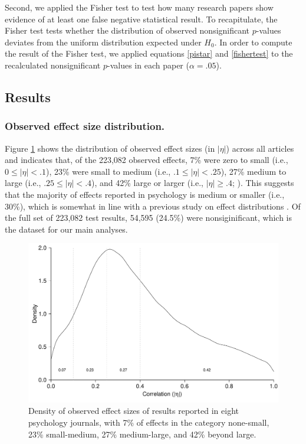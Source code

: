\documentclass{article}
\begin{document}
Second, we applied the Fisher test to test how many research papers show evidence of at least one false negative statistical result. To recapitulate, the Fisher test tests whether the distribution of observed nonsignificant $p$-values deviates from the uniform distribution expected under $H_0$. In order to compute the result of the Fisher test, we applied equations \ref{pistar} and \ref{fishertest} to the recalculated nonsignificant $p$-values in each paper ($\alpha=.05$).

\subsection*{Results}

\subsubsection*{Observed effect size distribution.}


Figure \ref{fig:fig1} shows the distribution of observed effect sizes (in $|\eta|$) across all articles and indicates that, of the 223,082 observed effects, 7\% were zero to small (i.e., $0\leq|\eta|<.1$), 23\% were small to medium (i.e., $.1\leq|\eta|<.25$), 27\% medium to large (i.e., $.25\leq|\eta|<.4$), and 42\% large or larger (i.e., $|\eta|\geq.4$; \cite{Cohen1988-wg}). This suggests that the majority of effects reported in psychology is medium or smaller (i.e., 30\%), which is somewhat in line with a previous study on effect distributions \cite{Gignac2016-je}. Of the full set of 223,082 test results, 54,595 (24.5\%) were nonsiginificant, which is the dataset for our main analyses. 

\begin{figure}
\begin{center}
\includegraphics{../figures/Fig1.pdf}
\end{center}
\caption{Density of observed effect sizes of results reported in eight psychology journals, with 7\% of effects in the category none-small, 23\% small-medium, 27\% medium-large, and 42\% beyond large.}
\label{fig:fig1}
\end{figure}
\end{document}
